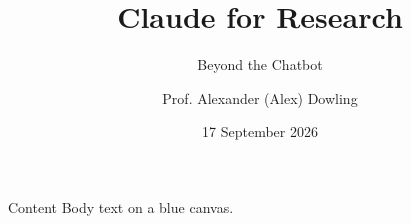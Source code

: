 \documentclass{beamer}
\title{Claude for Research}
\subtitle{Beyond the Chatbot}
\author{Prof. Alexander (Alex) Dowling}
\institute{Chemical and Biomolecular Engineering \\ adowling@nd.edu}
\date{17 September 2026}
\begin{document}
{
\begin{frame}[plain]\titlepage\end{frame}
}
\begin{frame}{Content}
Body text on a blue canvas.
\end{frame}
\end{document}
